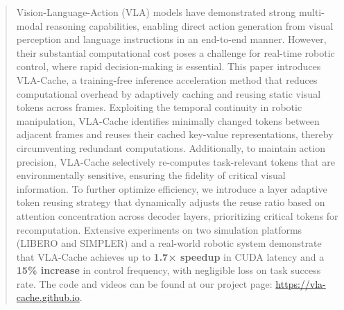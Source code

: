 \begin{abstract}
Vision-Language-Action (VLA) models have demonstrated strong multi-modal reasoning capabilities, enabling direct action generation from visual perception and language instructions in an end-to-end manner. However, their substantial computational cost poses a challenge for real-time robotic control, where rapid decision-making is essential. This paper introduces VLA-Cache, a training-free inference acceleration method that reduces computational overhead by adaptively caching and reusing static visual tokens across frames. Exploiting the temporal continuity in robotic manipulation, VLA-Cache identifies minimally changed tokens between adjacent frames and reuses their cached key-value representations, thereby circumventing redundant computations. Additionally, to maintain action precision, VLA-Cache selectively re-computes task-relevant tokens that are environmentally sensitive, ensuring the fidelity of critical visual information. To further optimize efficiency, we introduce a layer adaptive token reusing strategy that dynamically adjusts the reuse ratio based on attention concentration across decoder layers, prioritizing critical tokens for recomputation. Extensive experiments on two simulation platforms (LIBERO and SIMPLER) and a real-world robotic system demonstrate that VLA-Cache achieves up to \textbf{1.7× speedup} in CUDA latency and a \textbf{15\% increase} in control frequency, with negligible loss on task success rate. The code and videos can be found at our project page: \url{https://vla-cache.github.io}.
\end{abstract}

